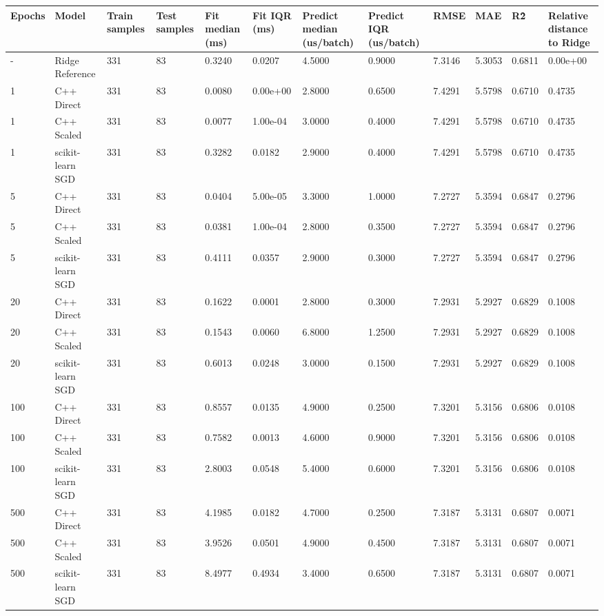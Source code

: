 \begin{table}[htbp]
\centering
\begin{tabular}{llllllllllll}
\toprule
Epochs & Model & Train samples & Test samples & Fit median (ms) & Fit IQR (ms) & Predict median (us/batch) & Predict IQR (us/batch) & RMSE & MAE & R\^2 & Relative distance to Ridge \\
\midrule
- & Ridge Reference & 331 & 83 & 0.3240 & 0.0207 & 4.5000 & 0.9000 & 7.3146 & 5.3053 & 0.6811 & 0.00e+00 \\
1 & C++ Direct & 331 & 83 & 0.0080 & 0.00e+00 & 2.8000 & 0.6500 & 7.4291 & 5.5798 & 0.6710 & 0.4735 \\
1 & C++ Scaled & 331 & 83 & 0.0077 & 1.00e-04 & 3.0000 & 0.4000 & 7.4291 & 5.5798 & 0.6710 & 0.4735 \\
1 & scikit-learn SGD & 331 & 83 & 0.3282 & 0.0182 & 2.9000 & 0.4000 & 7.4291 & 5.5798 & 0.6710 & 0.4735 \\
5 & C++ Direct & 331 & 83 & 0.0404 & 5.00e-05 & 3.3000 & 1.0000 & 7.2727 & 5.3594 & 0.6847 & 0.2796 \\
5 & C++ Scaled & 331 & 83 & 0.0381 & 1.00e-04 & 2.8000 & 0.3500 & 7.2727 & 5.3594 & 0.6847 & 0.2796 \\
5 & scikit-learn SGD & 331 & 83 & 0.4111 & 0.0357 & 2.9000 & 0.3000 & 7.2727 & 5.3594 & 0.6847 & 0.2796 \\
20 & C++ Direct & 331 & 83 & 0.1622 & 0.0001 & 2.8000 & 0.3000 & 7.2931 & 5.2927 & 0.6829 & 0.1008 \\
20 & C++ Scaled & 331 & 83 & 0.1543 & 0.0060 & 6.8000 & 1.2500 & 7.2931 & 5.2927 & 0.6829 & 0.1008 \\
20 & scikit-learn SGD & 331 & 83 & 0.6013 & 0.0248 & 3.0000 & 0.1500 & 7.2931 & 5.2927 & 0.6829 & 0.1008 \\
100 & C++ Direct & 331 & 83 & 0.8557 & 0.0135 & 4.9000 & 0.2500 & 7.3201 & 5.3156 & 0.6806 & 0.0108 \\
100 & C++ Scaled & 331 & 83 & 0.7582 & 0.0013 & 4.6000 & 0.9000 & 7.3201 & 5.3156 & 0.6806 & 0.0108 \\
100 & scikit-learn SGD & 331 & 83 & 2.8003 & 0.0548 & 5.4000 & 0.6000 & 7.3201 & 5.3156 & 0.6806 & 0.0108 \\
500 & C++ Direct & 331 & 83 & 4.1985 & 0.0182 & 4.7000 & 0.2500 & 7.3187 & 5.3131 & 0.6807 & 0.0071 \\
500 & C++ Scaled & 331 & 83 & 3.9526 & 0.0501 & 4.9000 & 0.4500 & 7.3187 & 5.3131 & 0.6807 & 0.0071 \\
500 & scikit-learn SGD & 331 & 83 & 8.4977 & 0.4934 & 3.4000 & 0.6500 & 7.3187 & 5.3131 & 0.6807 & 0.0071 \\
\bottomrule
\end{tabular}
\end{table}

